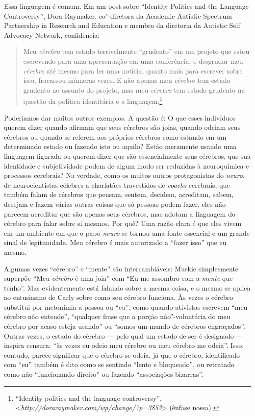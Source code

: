 Essa linguagem é comum. Em um post sobre ``Identity Politics and the
Language Controversy'', Dora Raymaker, co"-diretora da Academic Autistic
Spectrum Partnership in Research and Education e membro da diretoria da
Autistic Self Advocacy Network, confidencia:

\begin{quote}
Meu \emph{cérebro} tem estado terrivelmente ``grudento'' em um projeto
que estou escrevendo para uma apresentação em uma conferência, e
desgrudar meu \emph{cérebro} até mesmo para ler uma notícia, quanto mais
para escrever sobre isso, fracassou inúmeras vezes. E não apenas meu
\emph{cérebro} tem estado grudento no assunto do projeto, mas meu
\emph{cérebro} tem estado grudento na questão da política identitária e
a linguagem.\footnote[27]{``Identity politics and the language controversy'',
\textless{}\emph{http://doraraymaker.com/wp/change/?p=3853}\textgreater{} (ênfase nossa).}
\end{quote}

Poderíamos dar muitos outros exemplos. A questão é: O que esses
indivíduos querem dizer quando afirmam que seus cérebros são joias,
quando odeiam seus cérebros ou quando se referem aos próprios cérebros como estando em
um determinado estado ou fazendo isto ou aquilo? Estão meramente usando
uma linguagem figurada ou querem dizer que são essencialmente seus
cérebros, que sua identidade e subjetividade podem de algum modo ser
reduzidas à neuroquímica e processos cerebrais? Na verdade, como os
muitos outros protagonistas do \emph{neuro}, de neurocientistas
célebres a charlatães travestidos de \emph{coachs} cerebrais, que também
falam de cérebros que pensam, sentem, decidem, acreditam, sabem, desejam
e fazem várias outras coisas que só pessoas podem fazer, eles não
parecem acreditar que são apenas seus cérebros, mas adotam a linguagem
do cérebro para falar sobre si mesmos. Por quê? Uma razão clara é que
eles vivem em um ambiente em que o papo \emph{neuro} se tornou uma fonte
essencial e um grande sinal de legitimidade. Meu cérebro é mais
autorizado a ``fazer isso'' que eu mesmo.

Algumas vezes ``cérebro'' e ``mente'' são intercambiáveis: Muskie
simplesmente superpõe ``Meu \emph{cérebro} é uma joia'' com ``Eu me
assombro com a \emph{mente} que tenho''. Mas evidentemente está falando
sobre a mesma coisa, e o mesmo se aplica ao entusiasmo de Carly sobre
como seu cérebro funciona. Às vezes o cérebro substitui por metonímia a
pessoa ou ``eu'', como quando ativistas escrevem ``meu cérebro não
entende'', ``qualquer frase que a porção não"-voluntária do meu cérebro
por acaso esteja usando'' ou ``somos um mundo de cérebros engraçados''.
Outras vezes, o estado do cérebro --- pelo qual um estado de ser é
designado --- inspira censura: ``às vezes eu odeio meu cérebro ou meu
cérebro me odeia''. Isso, contudo, parece significar que o cérebro se
odeia, já que o cérebro, identificado com ``eu'' também é dito como se
sentindo ``lento e bloqueado'', ou retratado como não ``funcionando
direito'' ou fazendo ``associações bizarras''.

